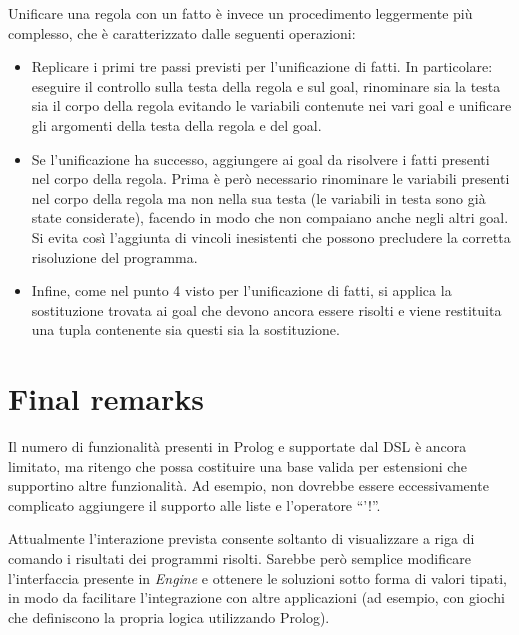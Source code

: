 Unificare una regola con un fatto è invece un procedimento leggermente più complesso, che è caratterizzato dalle seguenti operazioni:

\begin{itemize}
\item Replicare i primi tre passi previsti per l'unificazione di fatti. In particolare: eseguire il controllo sulla testa della regola e sul goal, rinominare sia la testa sia il corpo della regola evitando le variabili contenute nei vari goal e unificare gli argomenti della testa della regola e del goal.
\item Se l'unificazione ha successo, aggiungere ai goal da risolvere i fatti presenti nel corpo della regola. Prima è però necessario rinominare le variabili presenti nel corpo della regola ma non nella sua testa (le variabili in testa sono già state considerate), facendo in modo che non compaiano anche negli altri goal. Si evita così l'aggiunta di vincoli inesistenti che possono precludere la corretta risoluzione del programma.
\item Infine, come nel punto 4 visto per l'unificazione di fatti, si applica la sostituzione trovata ai goal che devono ancora essere risolti e viene restituita una tupla contenente sia questi sia la sostituzione.
\end{itemize}


\section{Final remarks}

Il numero di funzionalità presenti in Prolog e supportate dal DSL è ancora limitato, ma ritengo che possa costituire una base valida per estensioni che supportino altre funzionalità. Ad esempio, non dovrebbe essere eccessivamente complicato aggiungere il supporto alle liste e l'operatore ``'!''.

Attualmente l'interazione prevista consente soltanto di visualizzare a riga di comando i risultati dei programmi risolti. Sarebbe però semplice modificare l'interfaccia presente in \textit{Engine} e ottenere le soluzioni sotto forma di valori tipati, in modo da facilitare l'integrazione con altre applicazioni (ad esempio, con giochi che definiscono la propria logica utilizzando Prolog).

